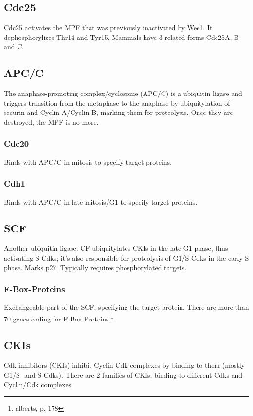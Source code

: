 \documentclass{article}
\begin{document}
	\subsection{Cdc25}
	Cdc25 activates the MPF that was previously inactivated by Wee1. It dephosphorylizes Thr14 and Tyr15. Mammals have 3 related forms Cdc25A, B and C.
	
	\subsection{APC/C}
	The anaphase-promoting complex/cyclosome (APC/C) is a ubiquitin ligase and triggers transition from the metaphase to the anaphase by ubiquitylation of securin and Cyclin-A/Cyclin-B, marking them for proteolysis. Once they are destroyed, the MPF is no more.
	
	\subsubsection{Cdc20}
	Binds with APC/C in mitosis to specify target proteins.
	
	\subsubsection{Cdh1}
	Binds with APC/C in late mitosis/G1 to specify target proteins.
	
	\subsection{SCF}
	Another ubiquitin ligase. CF ubiquitylates CKIs in the late G1 phase, thus activating S-Cdks; it's also responsible for proteolysis of G1/S-Cdks in the early S phase. Marks p27. Typically requires phosphorylated targets.
	
	\subsubsection{F-Box-Proteins}
	Exchangeable part of the SCF, specifying the target protein. There are more than 70 genes coding for F-Box-Proteins.\footnote{alberts, p. 178}
	
	\subsection{CKIs}
	Cdk inhibitors (CKIs) inhibit Cyclin-Cdk complexes by binding to them (mostly G1/S- and S-Cdks). There are 2 families of CKIs, binding to different Cdks and Cyclin/Cdk complexes:
	
\end{document}
